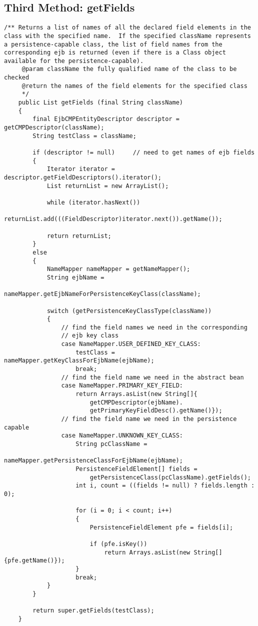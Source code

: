 \newpage
\subsection{Third Method: getFields}

\begin{lstlisting}
/** Returns a list of names of all the declared field elements in the class with the specified name.  If the specified className represents a persistence-capable class, the list of field names from the corresponding ejb is returned (even if there is a Class object available for the persistence-capable).
	 @param className the fully qualified name of the class to be checked 
	 @return the names of the field elements for the specified class
	 */
	public List getFields (final String className)
	{
		final EjbCMPEntityDescriptor descriptor = getCMPDescriptor(className);
		String testClass = className;

		if (descriptor != null)		// need to get names of ejb fields
		{
			Iterator iterator = descriptor.getFieldDescriptors().iterator();
			List returnList = new ArrayList();

			while (iterator.hasNext())
				returnList.add(((FieldDescriptor)iterator.next()).getName());

			return returnList;
		}
		else
		{
			NameMapper nameMapper = getNameMapper();
			String ejbName = 
				nameMapper.getEjbNameForPersistenceKeyClass(className);

			switch (getPersistenceKeyClassType(className))
			{
				// find the field names we need in the corresponding 
				// ejb key class
				case NameMapper.USER_DEFINED_KEY_CLASS:
					testClass = nameMapper.getKeyClassForEjbName(ejbName);
					break;
				// find the field name we need in the abstract bean 
				case NameMapper.PRIMARY_KEY_FIELD:
					return Arrays.asList(new String[]{
						getCMPDescriptor(ejbName).
						getPrimaryKeyFieldDesc().getName()});
				// find the field name we need in the persistence capable 
				case NameMapper.UNKNOWN_KEY_CLASS:
					String pcClassName = 
						nameMapper.getPersistenceClassForEjbName(ejbName);
					PersistenceFieldElement[] fields = 
						getPersistenceClass(pcClassName).getFields();
					int i, count = ((fields != null) ? fields.length : 0);

					for (i = 0; i < count; i++)
					{
						PersistenceFieldElement pfe = fields[i];

						if (pfe.isKey())
							return Arrays.asList(new String[]{pfe.getName()});
					}
					break;
			}
		}

		return super.getFields(testClass);
	}
\end{lstlisting}


